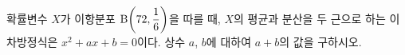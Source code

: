 확률변수 $X$가 이항분포 $\mathrm{B}\!\left(72{,}\mkern3mu\mathopen{}\dfrac{1}{6}\right)$을 따를 때, $X$의 평균과 분산을 두 근으로 하는 이차방정식은 $x^2+ax+b=0$이다. 상수 $a$, $b$에 대하여 $a+b$의 값을 구하시오.
